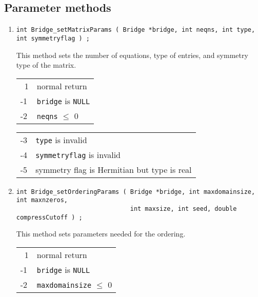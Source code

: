 \subsection{Parameter methods}
\label{subsection:Bridge:proto:parameters}
\par
\begin{enumerate}
\item
\begin{verbatim}
int Bridge_setMatrixParams ( Bridge *bridge, int neqns, int type, int symmetryflag ) ;
\end{verbatim}
This method sets the number of equations, type of entries, 
and symmetry type of the matrix.
\par {}
\begin{center}
\begin{tabular}{ll}
~1 & normal return \\
-1 & \texttt{bridge} is \texttt{NULL} \\
-2 & \texttt{neqns} $\le$ 0
\end{tabular}
\begin{tabular}{ll}
-3 & \texttt{type} is invalid \\
-4 & \texttt{symmetryflag} is invalid \\
-5 & symmetry flag is Hermitian but type is real
\end{tabular}
\end{center}
\item
\begin{verbatim}
int Bridge_setOrderingParams ( Bridge *bridge, int maxdomainsize, int maxnzeros, 
                               int maxsize, int seed, double compressCutoff ) ;
\end{verbatim}
This method sets parameters needed for the ordering.
\par {}
\begin{center}
\begin{tabular}{ll}
~1 & normal return \\
-1 & \texttt{bridge} is \texttt{NULL} \\
-2 & \texttt{maxdomainsize} $\le$ 0
\end{tabular}

\end{center}
\end{enumerate}

